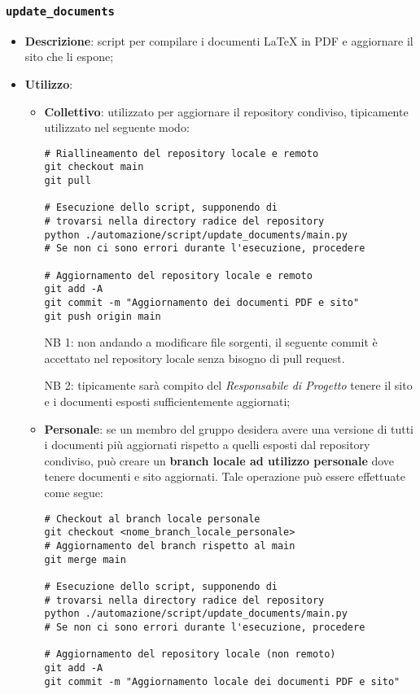 \subsubsection{\texttt{update\_documents}}
\begin{itemize}
    \item \textbf{Descrizione}: script per compilare i documenti \LaTeX{} in PDF e aggiornare il sito che li espone;
    \item \textbf{Utilizzo}:
    \begin{itemize}
        \item \textbf{Collettivo}: utilizzato per aggiornare il repository condiviso, tipicamente utilizzato nel seguente modo:
\begin{Verbatim}[fontsize=\small]
# Riallineamento del repository locale e remoto
git checkout main
git pull

# Esecuzione dello script, supponendo di
# trovarsi nella directory radice del repository
python ./automazione/script/update_documents/main.py
# Se non ci sono errori durante l'esecuzione, procedere

# Aggiornamento del repository locale e remoto
git add -A
git commit -m "Aggiornamento dei documenti PDF e sito"
git push origin main
\end{Verbatim}

        NB 1: non andando a modificare file sorgenti, il seguente commit è accettato nel repository locale senza bisogno di pull request.

        NB 2: tipicamente sarà compito del \textit{Responsabile di Progetto} tenere il sito e i documenti esposti sufficientemente aggiornati;

        \item \textbf{Personale}: se un membro del gruppo desidera avere una versione di tutti i documenti più aggiornati rispetto a quelli esposti dal repository condiviso, può creare un \textbf{branch locale ad utilizzo personale} dove tenere documenti e sito aggiornati. Tale operazione può essere effettuate come segue:
\begin{Verbatim}[fontsize=\small]
# Checkout al branch locale personale
git checkout <nome_branch_locale_personale>
# Aggiornamento del branch rispetto al main
git merge main

# Esecuzione dello script, supponendo di
# trovarsi nella directory radice del repository
python ./automazione/script/update_documents/main.py
# Se non ci sono errori durante l'esecuzione, procedere

# Aggiornamento del repository locale (non remoto)
git add -A
git commit -m "Aggiornamento locale dei documenti PDF e sito"
\end{Verbatim}
    \end{itemize}
\end{itemize}


